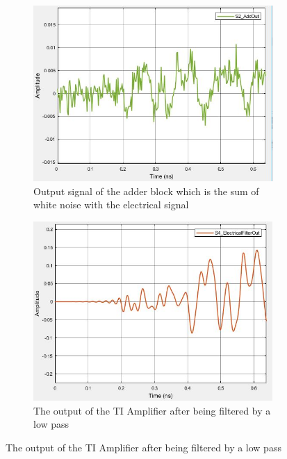 \begin{figure}[H]
	\begin{subfigure}{0.4\textwidth}
		\centering
		\includegraphics[scale=0.35]{./lib/ti_amplifier/figures/adder_out.png}
		\caption{Output signal of the adder block which is the sum of white noise with the electrical signal}
		\label{fig:Adder Out}
\end{subfigure}
	\begin{subfigure}{0.4\textwidth}
		\centering
		\includegraphics[scale=0.35]{./lib/ti_amplifier/figures/filter_out.png}
		\caption{The output of the TI Amplifier after being filtered by a low pass}
		\label{fig:TI_out}
	\end{subfigure}
\end{figure}
\pagebreak

